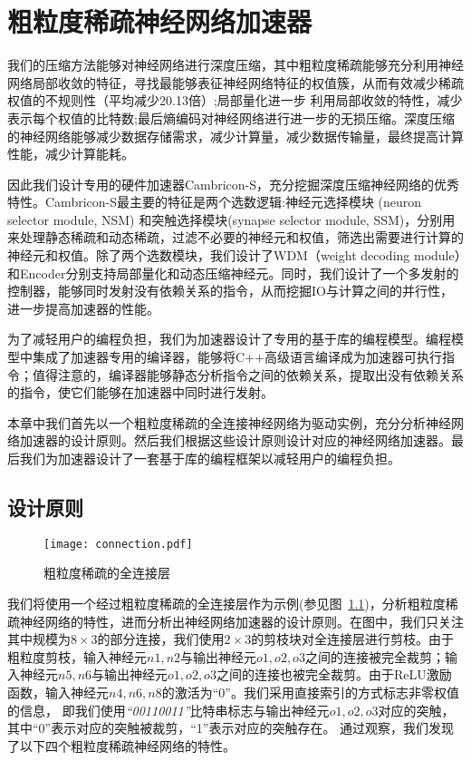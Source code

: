 \chapter{粗粒度稀疏神经网络加速器}

我们的压缩方法能够对神经网络进行深度压缩，其中粗粒度稀疏能够充分利用神经网络局部收敛的特征，寻找最能够表征神经网络特征的权值簇，从而有效减少稀疏权值的不规则性（平均减少20.13倍）;局部量化进一步
利用局部收敛的特性，减少表示每个权值的比特数;最后熵编码对神经网络进行进一步的无损压缩。深度压缩的神经网络能够减少数据存储需求，减少计算量，减少数据传输量，最终提高计算性能，减少计算能耗。

因此我们设计专用的硬件加速器Cambricon-S，充分挖掘深度压缩神经网络的优秀特性。Cambricon-S最主要的特征是两个选数逻辑:神经元选择模块 (neuron selector module, NSM) 和突触选择模块(synapse selector module, SSM)，分别用来处理静态稀疏和动态稀疏，过滤不必要的神经元和权值，筛选出需要进行计算的神经元和权值。除了两个选数模块，我们设计了WDM（weight decoding module）和Encoder分别支持局部量化和动态压缩神经元。同时，我们设计了一个多发射的控制器，能够同时发射没有依赖关系的指令，从而挖掘IO与计算之间的并行性，进一步提高加速器的性能。

为了减轻用户的编程负担，我们为加速器设计了专用的基于库的编程模型。编程模型中集成了加速器专用的编译器，能够将C++高级语言编译成为加速器可执行指令；值得注意的，编译器能够静态分析指令之间的依赖关系，提取出没有依赖关系的指令，使它们能够在加速器中同时进行发射。

本章中我们首先以一个粗粒度稀疏的全连接神经网络为驱动实例，充分分析神经网络加速器的设计原则。然后我们根据这些设计原则设计对应的神经网络加速器。最后我们为加速器设计了一套基于库的编程框架以减轻用户的编程负担。

\section{设计原则}
\label{sec:principle}

\begin{figure}[ht]
\centering
\texttt{[image: connection.pdf]}
\caption{粗粒度稀疏的全连接层}
\label{fig:connection}
\end{figure}

我们将使用一个经过粗粒度稀疏的全连接层作为示例(参见图~\ref{fig:connection})，分析粗粒度稀疏神经网络的特性，进而分析出神经网络加速器的设计原则。在图中，我们只关注其中规模为$8\times 3$的部分连接，我们使用$2\times 3$的剪枝块对全连接层进行剪枝。由于粗粒度剪枝，输入神经元$n1, n2$与输出神经元$o1, o2, o3$之间的连接被完全裁剪；输入神经元$n5, n6$与输出神经元$o1, o2, o3$之间的连接也被完全裁剪。由于ReLU激励函数，输入神经元$n4, n6, n8$的激活为“0”。我们采用直接索引的方式标志非零权值的信息，
即我们使用\emph{“00110011”}比特串标志与输出神经元$o1, o2, o3$对应的突触，其中“0”表示对应的突触被裁剪，“1”表示对应的突触存在。
通过观察，我们发现了以下四个粗粒度稀疏神经网络的特性。

